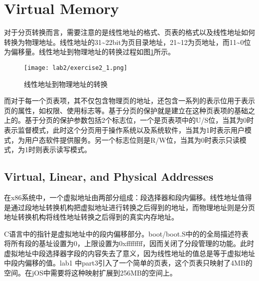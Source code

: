 \section{Virtual Memory}
\begin{exerciseSolution}{2}
    \par 对于分页转换而言，需要注意的是线性地址的格式、页表的格式以及线性地址如何转换为物理地址。线性地址的31\textasciitilde 22bit为页目录地址，21\textasciitilde 12为页地址，而11\textasciitilde 0位为偏移量。线性地址到物理地址的转换过程如图\ref{fig:lab2/exercise2_1}所示。
    \begin{figure}[htb]
        \centering
        \texttt{[image: lab2/exercise2\_1.png]}
        \caption{线性地址到物理地址的转换}
        \label{fig:lab2/exercise2_1}
    \end{figure}
    \par 而对于每一个页表项，其不仅包含物理页的地址，还包含一系列的表示位用于表示页的属性，如权限、使用标志等。基于分页的保护就是建立在这种页表项的基础之上的。基于分页的保护参数包括2个标志位，一个是页表项中的U/S位，当其为0时表示监督模式，此时这个分页用于操作系统以及系统软件，当其为1时表示用户模式，为用户态软件提供服务。另一个标志位则是R/W位，当其为0时表示只读模式，为1时则表示读写模式。
\end{exerciseSolution}

\subsection{Virtual, Linear, and Physical Addresses}
\label{sub:virtual_linear_and_physical_addresses}

\par 在x86系统中，一个虚拟地址由两部分组成：段选择器和段内偏移。线性地址值得是通过段地址转换机构把虚拟地址进行转换之后得到的地址，而物理地址则是分页地址转换机构将线性地址转换之后得到的真实内存地址。
\par C语言中的指针是虚拟地址中的段内偏移部分。boot/boot.S中的的全局描述符表将所有段的基址设置为0，上限设置为0xffffffff，因而关闭了分段管理的功能。此时虚拟地址中段选择器字段的内容失去了意义，因为线性地址的值总是等于虚拟地址中段内偏移的值。lab1 中part3引入了一个简单的页表，这个页表只映射了4MB的空间。在jOS中需要将这种映射扩展到256MB的空间上。

